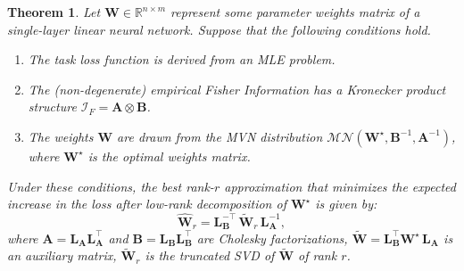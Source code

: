 \documentclass{article}
\newtheorem{theorem}{Theorem}
\begin{document}
\begin{theorem}%
\label{th:ABsolution}
Let $\mathbf{W} \in \mathbb{R}^{n \times m}$ represent some  parameter weights matrix of a single-layer linear neural network. Suppose that the following conditions hold.
\begin{enumerate}
    \item The task loss function is derived from an MLE problem. 
    
    \item The (non-degenerate) empirical Fisher Information has a Kronecker product structure $\mathcal{I}_F = \mathbf{A} \otimes \mathbf{B}$.
    
    \item The weights $\mathbf{W}$ are drawn from the MVN distribution $\mathcal{MN}(\mathbf{W}^\star, \mathbf{B}^{-1}, \mathbf{A}^{-1})$, where $\mathbf{W}^\star$ is the optimal weights matrix.
    
\end{enumerate}

Under these conditions, the best rank-$r$ approximation that minimizes the expected increase in the loss after low-rank decomposition of $\mathbf{W}^{\star}$ is given by:
\begin{equation}
 \label{eq:gfwsvd_dec}
\widehat{\mathbf{W}}_r = \mathbf{L}_\mathbf{B}^{-\top} \, \widetilde{\mathbf{W}}_r \, \mathbf{L}_\mathbf{A}^{-1},
\end{equation}
where $\mathbf{A} = \mathbf{L}_\mathbf{A}^{} \mathbf{L}_\mathbf{A}^\top$ and $\mathbf{B} = \mathbf{L}_\mathbf{B}^{} \mathbf{L}_\mathbf{B}^\top$ are Cholesky factorizations, $\widetilde{\mathbf{W}} = \mathbf{L}_\mathbf{B}^\top \mathbf{W}^{\star}\, \mathbf{L}_\mathbf{A}^{}$ is an auxiliary matrix, $\widetilde{\mathbf{W}}_r$ is the truncated SVD of $\widetilde{\mathbf{W}}$ of rank $r$.
\end{theorem}
\end{document}
